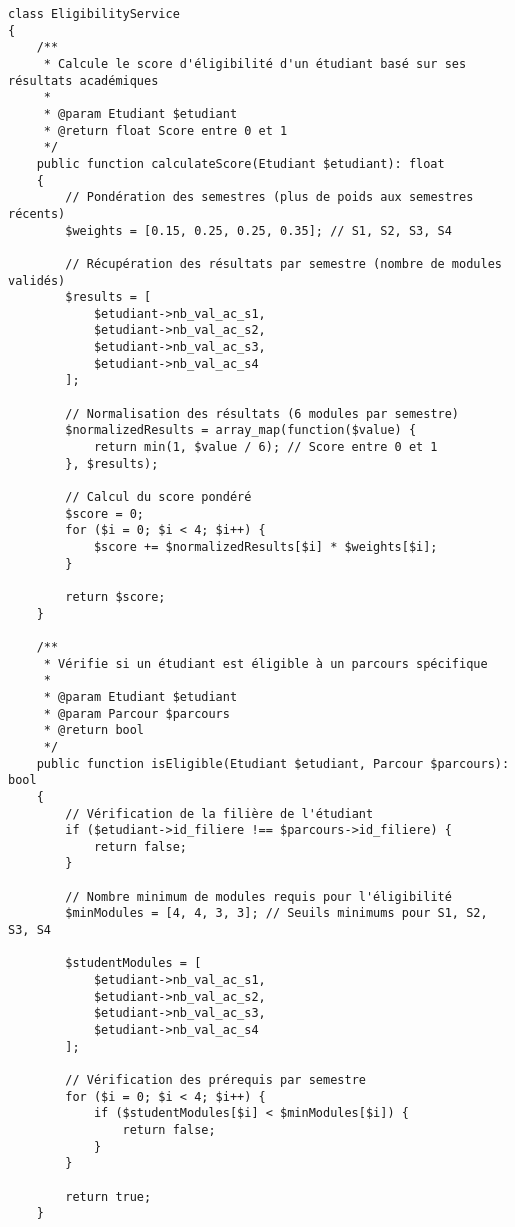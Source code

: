 \documentclass[french,12pt]{report} %
\begin{document}
\begin{lstlisting}[style=phpstyle,caption={EligibilityService - Calcul des scores d'éligibilité}]
class EligibilityService
{
    /**
     * Calcule le score d'éligibilité d'un étudiant basé sur ses résultats académiques
     * 
     * @param Etudiant $etudiant
     * @return float Score entre 0 et 1
     */
    public function calculateScore(Etudiant $etudiant): float
    {
        // Pondération des semestres (plus de poids aux semestres récents)
        $weights = [0.15, 0.25, 0.25, 0.35]; // S1, S2, S3, S4
        
        // Récupération des résultats par semestre (nombre de modules validés)
        $results = [
            $etudiant->nb_val_ac_s1, 
            $etudiant->nb_val_ac_s2,
            $etudiant->nb_val_ac_s3, 
            $etudiant->nb_val_ac_s4
        ];
        
        // Normalisation des résultats (6 modules par semestre)
        $normalizedResults = array_map(function($value) {
            return min(1, $value / 6); // Score entre 0 et 1
        }, $results);
        
        // Calcul du score pondéré
        $score = 0;
        for ($i = 0; $i < 4; $i++) {
            $score += $normalizedResults[$i] * $weights[$i];
        }
        
        return $score;
    }
    
    /**
     * Vérifie si un étudiant est éligible à un parcours spécifique
     * 
     * @param Etudiant $etudiant
     * @param Parcour $parcours
     * @return bool
     */
    public function isEligible(Etudiant $etudiant, Parcour $parcours): bool
    {
        // Vérification de la filière de l'étudiant
        if ($etudiant->id_filiere !== $parcours->id_filiere) {
            return false;
        }
        
        // Nombre minimum de modules requis pour l'éligibilité
        $minModules = [4, 4, 3, 3]; // Seuils minimums pour S1, S2, S3, S4
        
        $studentModules = [
            $etudiant->nb_val_ac_s1,
            $etudiant->nb_val_ac_s2,
            $etudiant->nb_val_ac_s3,
            $etudiant->nb_val_ac_s4
        ];
        
        // Vérification des prérequis par semestre
        for ($i = 0; $i < 4; $i++) {
            if ($studentModules[$i] < $minModules[$i]) {
                return false;
            }
        }
        
        return true;
    }
    

\end{lstlisting}
\end{document}
